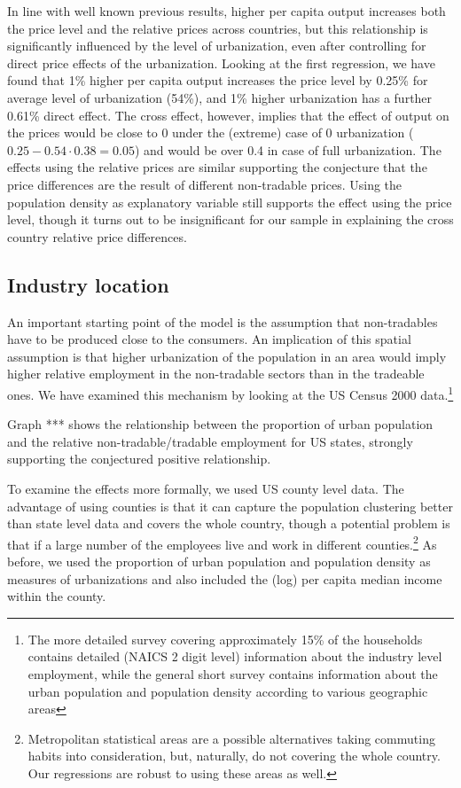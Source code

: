 \documentclass[12pt]{article}
\begin{document}
In line with well known previous results, higher per capita output
increases both the price level and the relative prices across
countries, but this relationship is significantly influenced by the
level of urbanization, even after controlling for direct price
effects of the urbanization. Looking at the first regression, we
have found that 1\% higher per capita output increases the price
level by 0.25\% for average level of urbanization (54\%), and 1\%
higher urbanization has a further 0.61\% direct effect. The cross
effect, however, implies that the effect of output on the prices
would be close to 0 under the (extreme) case of 0 urbanization
($0.25-0.54\cdot0.38=0.05$) and would be over 0.4 in case of full
urbanization. The effects using the relative prices are similar
supporting the conjecture that the price differences are the result
of different non-tradable prices. Using the population density as
explanatory variable still supports the effect using the price
level, though it turns out to be insignificant for our sample in
explaining the cross country relative price differences.

\subsection{Industry location}
An important starting point of the model is the assumption that
non-tradables have to be produced close to the consumers. An
implication of this spatial assumption is that higher urbanization
of the population in an area would imply higher relative employment
in the non-tradable sectors than in the tradeable ones. We have
examined this mechanism by looking at the US Census 2000
data.\footnote{The more detailed survey covering approximately 15\%
of the households contains detailed (NAICS 2 digit level)
information about the industry level employment, while the general
short survey contains information about the urban population and
population density according to various geographic areas}

Graph *** shows the relationship between the proportion of urban
population and the relative non-tradable/tradable employment for US
states, strongly supporting the conjectured positive relationship.

To examine the effects more formally, we used US county level data.
The advantage of using counties is that it can capture the
population clustering better than state level data and covers the
whole country, though a potential problem is that if a large number
of the employees live and work in different
counties.\footnote{Metropolitan statistical areas are a possible
alternatives taking commuting habits into consideration, but,
naturally, do not covering the whole country. Our regressions are
robust to using these areas as well.} As before, we used the
proportion of urban population and population density as measures of
urbanizations and also included the (log) per capita median income
within the county.
\end{document}
